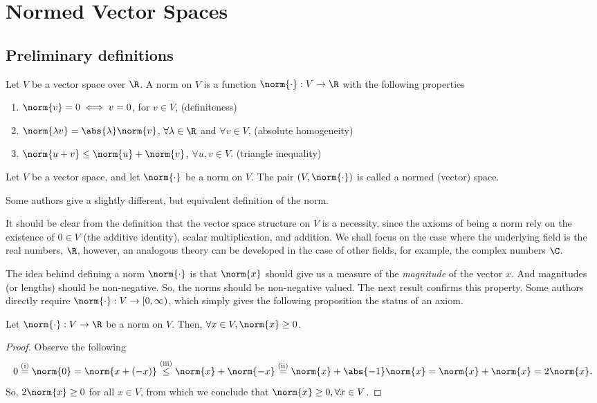 \section{Normed Vector Spaces}
\subsection{Preliminary definitions}
\begin{ndfn}[Norm]
  Let $V$ be a vector space over $\R$. A norm on $V$ is a function $\norm{\cdot}:V\to\R$ with the following properties
  \begin{enumerate}
  \item $\norm{v} = 0 \iff v =0$, for $v \in V$, \hfill (definiteness)
  \item $\norm{\lambda v} = \abs{\lambda}\norm{v}$, $\forall \lambda \in \R$ and $\forall v \in V$, \hfill (absolute homogeneity)
  \item $\norm{u+v} \leq \norm{u} + \norm{v}$, $\forall u,v \in V$. \hfill (triangle inequality)
  \end{enumerate}
\end{ndfn}

\begin{ndfn}
  Let $V$ be a vector space, and let $\norm{\cdot}$ be a norm on $V$. The pair $(V, \norm{\cdot})$ is called a normed (vector) space.
\end{ndfn}

Some authors give a slightly different, but equivalent definition of the norm.

It should be clear from the definition that the vector space structure on $V$ is a necessity, since the axioms of being a norm rely on the existence of $0 \in V$ (the additive identity), scalar multiplication, and addition. We shall focus on the case where the underlying field is the real numbers, $\R$, however, an analogous theory can be developed in the case of other fields, for example, the complex numbers $\C$.

The idea behind defining a norm $\norm{\cdot}$ is that $\norm{x}$ should give us a measure of the \emph{magnitude} of the vector $x$. And magnitudes (or lengths) should be non-negative. So, the norms should be non-negative valued. The next result confirms this property. Some authors directly require $\norm{\cdot}:V\to[0,\infty)$, which simply gives the following proposition the status of an axiom.

\begin{nprop}
  Let $\norm{\cdot}:V\to\R$ be a norm on $V$. Then, $\forall x \in V, \norm{x} \geq 0$.
\end{nprop}
\begin{proof}
  Observe the following
  \begin{equation*}
    0
    \overset{\text{(i)}}{=} \norm{0}
    = \norm{x+(-x)}
    \overset{\text{(iii)}}{\leq} \norm{x} + \norm{-x}
    \overset{\text{(ii)}}{=} \norm{x} + \abs{-1}\norm{x}
    = \norm{x} + \norm{x}
    = 2\norm{x}.
  \end{equation*}
  So, $2\norm{x} \geq 0$ for all $x \in V$, from which we conclude that $\norm{x} \geq 0, \forall x \in V$.
\end{proof}

